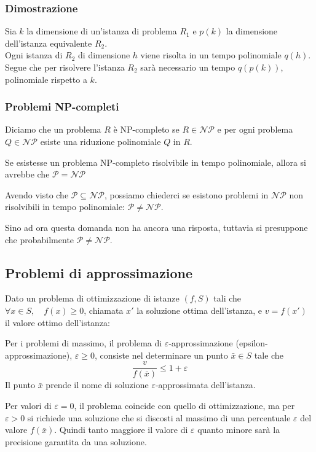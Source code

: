 \documentclass[../template]{subfiles}
\begin{document}
\subsubsection{Dimostrazione}
Sia $k$ la dimensione di un'istanza di problema $R_1$ e $p(k)$ la dimensione dell'istanza equivalente $R_2$.
\\
Ogni istanza di $R_2$ di dimensione $h$ viene risolta in un tempo polinomiale $q(h)$.
\\
Segue che per risolvere l'istanza $R_2$ sarà necessario un tempo $q(p(k))$, polinomiale rispetto a $k$.

\subsubsection{Problemi NP-completi}
Diciamo che un problema $R$ è NP-completo se $R \in \mathcal{NP}$ e per ogni problema $Q \in \mathcal{NP}$ esiste una riduzione polinomiale $Q$ in $R$.

Se esistesse un problema NP-completo risolvibile in tempo polinomiale, allora si avrebbe che $\mathcal{P} = \mathcal{NP}$

Avendo visto che $\mathcal{P} \subseteq \mathcal{NP}$, possiamo chiederci se esistono problemi in $\mathcal{NP}$ non risolvibili in tempo polinomiale: $\mathcal{P} \neq \mathcal{NP}$.

Sino ad ora questa domanda non ha ancora una risposta, tuttavia si presuppone che probabilmente $\mathcal{P} \neq \mathcal{NP}$.

\subsection{Problemi di approssimazione}
Dato un problema di ottimizzazione di istanze $(f, S)$ tali che $\forall x \in S, \quad f(x) \ge 0$, chiamata $x'$ la soluzione ottima dell'istanza, e $v = f(x')$ il valore ottimo dell'istanza:

Per i problemi di massimo, il problema di $\varepsilon$-approssimazione (epsilon-approssimazione), $\varepsilon \ge 0$, consiste nel determinare un punto $\bar{x} \in S$ tale che
\[
    \frac{v}{f(\bar{x})} \le 1 + \varepsilon
\]
Il punto $\bar{x}$ prende il nome di soluzione $\varepsilon$-approssimata  dell'istanza.

Per valori di $\varepsilon =0$, il problema coincide con quello di ottimizzazione, ma per $\varepsilon > 0$ si richiede una soluzione che si discosti al massimo di una percentuale $\varepsilon$ del valore $f(\bar{x})$. Quindi tanto maggiore il valore di $\varepsilon$ quanto minore sarà la precisione garantita da una soluzione.
\end{document}
